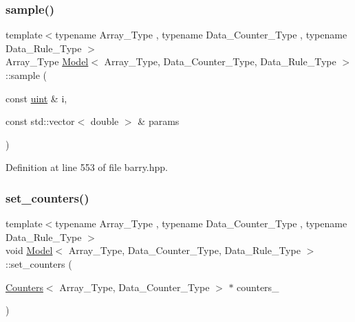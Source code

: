 \mbox{\label{classbarry_1_1_model_a7fb66a67707f610b70ee05b814373f49}} 
\subsubsection{\texorpdfstring{sample()}{sample()}\hspace{0.1cm}{\footnotesize\ttfamily [2/2]}}
{\footnotesize\ttfamily template$<$typename Array\+\_\+\+Type , typename Data\+\_\+\+Counter\+\_\+\+Type , typename Data\+\_\+\+Rule\+\_\+\+Type $>$ \\
Array\+\_\+\+Type \hyperlink{classbarry_1_1_model}{Model}$<$ Array\+\_\+\+Type, Data\+\_\+\+Counter\+\_\+\+Type, Data\+\_\+\+Rule\+\_\+\+Type $>$\+::sample (\begin{DoxyParamCaption}\item[{const \hyperlink{namespacebarry_a11dfc53ddb4672278319aa04f1e09a6c}{uint} \&}]{i,  }\item[{const std\+::vector$<$ double $>$ \&}]{params }\end{DoxyParamCaption})\hspace{0.3cm}{\ttfamily [inline]}}



Definition at line 553 of file barry.\+hpp.

\mbox{\label{classbarry_1_1_model_aab2ba8c90b888cfa2143bccf42fcb89f}} 
\subsubsection{\texorpdfstring{set\+\_\+counters()}{set\_counters()}}
{\footnotesize\ttfamily template$<$typename Array\+\_\+\+Type , typename Data\+\_\+\+Counter\+\_\+\+Type , typename Data\+\_\+\+Rule\+\_\+\+Type $>$ \\
void \hyperlink{classbarry_1_1_model}{Model}$<$ Array\+\_\+\+Type, Data\+\_\+\+Counter\+\_\+\+Type, Data\+\_\+\+Rule\+\_\+\+Type $>$\+::set\+\_\+counters (\begin{DoxyParamCaption}\item[{\hyperlink{classbarry_1_1_counters}{Counters}$<$ Array\+\_\+\+Type, Data\+\_\+\+Counter\+\_\+\+Type $>$ $\ast$}]{counters\+\_\+ }\end{DoxyParamCaption})\hspace{0.3cm}{\ttfamily [inline]}}



